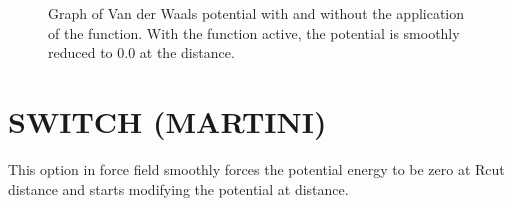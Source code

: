 \documentclass[letterpaper,10pt,english]{sphinxmanual}
\begin{document}
\begin{description}
\begin{figure}[htbp]
\noindent{}
\caption{Graph of Van der Waals potential with and without the application of the  function. With the  function active, the potential is smoothly reduced to 0.0 at the  distance.}\label{\detokenize{vdw_energy:id3}}\end{figure}

\end{description}


\section{SWITCH (MARTINI)}
\label{\detokenize{vdw_energy:switch-martini}}
\sphinxAtStartPar
This option in  force field smoothly forces the potential energy to be zero at Rcut distance and starts modifying the potential at  distance.
\end{document}
